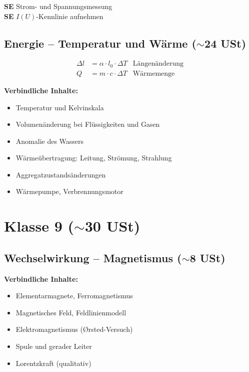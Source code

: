 \documentclass[11pt,a4paper]{article}
\newcommand{\SE}{\textcolor{accentgreen}{\textbf{SE}}}
\begin{document}
\begin{experimentbox}
\SE{} Strom- und Spannungsmessung\\
\SE{} $I(U)$-Kennlinie aufnehmen
\end{experimentbox}

\subsection{Energie -- Temperatur und Wärme ($\sim$24 USt)}

\begin{formelbox}
\begin{align*}
\Delta l &= \alpha \cdot l_0 \cdot \Delta T & \text{Längenänderung} \\
Q &= m \cdot c \cdot \Delta T & \text{Wärmemenge}
\end{align*}
\end{formelbox}

\textbf{Verbindliche Inhalte:}
\begin{itemize}[leftmargin=0.5cm, itemsep=1pt]
\item Temperatur und Kelvinskala
\item Volumenänderung bei Flüssigkeiten und Gasen
\item Anomalie des Wassers
\item Wärmeübertragung: Leitung, Strömung, Strahlung
\item Aggregatzustandsänderungen
\item Wärmepumpe, Verbrennungsmotor
\end{itemize}

\newpage
\section{Klasse 9 ($\sim$30 USt)}

\subsection{Wechselwirkung -- Magnetismus ($\sim$8 USt)}

\textbf{Verbindliche Inhalte:}
\begin{itemize}[leftmargin=0.5cm, itemsep=1pt]
\item Elementarmagnete, Ferromagnetismus
\item Magnetisches Feld, Feldlinienmodell
\item Elektromagnetismus (Ørsted-Versuch)
\item Spule und gerader Leiter
\item Lorentzkraft (qualitativ)
\end{itemize}
\end{document}

